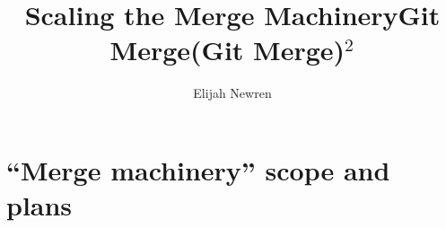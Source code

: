 \documentclass[compress,t]{beamer}
\title{Scaling the Merge Machinery}
\author{Elijah Newren}
\institute{Palantir Technologies}
\date{}
\begin{document}

\begin{frame}
  \titlepage
\end{frame}

\title{Git Merge}
\begin{frame}
  \titlepage
\end{frame}

\title{(Git Merge)$^2$}
\begin{frame}
  \titlepage
\end{frame}

\section[Scope]{``Merge machinery'' scope and plans}

\begin{comment}
\subsection{Division}
\begin{frame}
  \frametitle{Division}

  \begin{itemize}[<+->]

    \item xdiff/xmerge.c: 3-way content merging of a single file
    \item ll-merge.c: thin xdl\_merge wrapper; heeds path-specific
          .gitattributes such as special drivers or normalization

    \item merge-recursive.c (default strategy and main engine): finds
          and pre-merges merge-bases, handles path based-conflicts,
          mode-based conflicts (e.g. symlink vs. submodule),
          renames, and wires everything together.

    \item builtin/merge.c: which strategy (octopus, fast-forward,
          default), diffstat, etc.
  \end{itemize}

\end{frame}
\end{comment}
\end{document}
